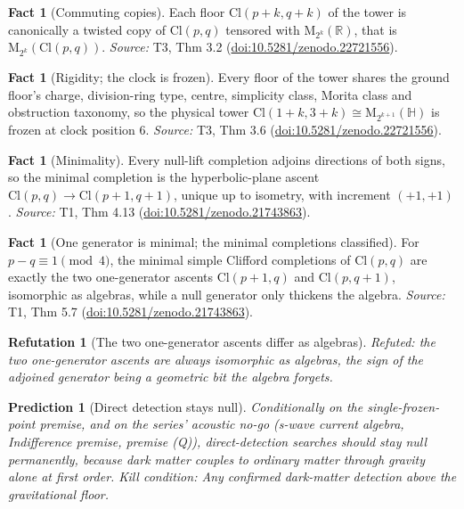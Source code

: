 \documentclass[11pt]{article}
\newtheorem{refutation}[theorem]{Refutation}
\newtheorem{prediction}[theorem]{Prediction}
\theoremstyle{definition}
\newtheorem{fact}[theorem]{Fact}
\theoremstyle{plain}
\providecommand{\Cl}{}\renewcommand{\Cl}{\mathrm{Cl}}
\providecommand{\HH}{}\renewcommand{\HH}{\mathbb{H}}
\providecommand{\Mat}{}\renewcommand{\Mat}{\mathrm{M}}
\providecommand{\R}{}\renewcommand{\R}{\mathbb{R}}
\begin{document}
\begin{fact}[Commuting copies]\label{c:tower.commuting-copies}
Each floor $\Cl(p{+}k, q{+}k)$ of the tower is canonically a twisted copy of $\Cl(p,q)$ tensored with $\Mat_{2^k}(\R)$, that is $\Mat_{2^k}(\Cl(p,q))$.
\emph{Source:} T3, Thm 3.2 (\href{https://doi.org/10.5281/zenodo.22721556}{doi:10.5281/zenodo.22721556}).
\end{fact}

\begin{fact}[Rigidity; the clock is frozen]\label{c:tower.rigidity-clock-frozen}
Every floor of the tower shares the ground floor's charge, division-ring type, centre, simplicity class, Morita class and obstruction taxonomy, so the physical tower $\Cl(1{+}k, 3{+}k) \cong \Mat_{2^{k+1}}(\HH)$ is frozen at clock position $6$.
\emph{Source:} T3, Thm 3.6 (\href{https://doi.org/10.5281/zenodo.22721556}{doi:10.5281/zenodo.22721556}).
\end{fact}

\begin{fact}[Minimality]\label{c:transport.minimality}
Every null-lift completion adjoins directions of both signs, so the minimal completion is the hyperbolic-plane ascent $\Cl(p,q) \to \Cl(p{+}1,q{+}1)$, unique up to isometry, with increment $(+1,+1)$.
\emph{Source:} T1, Thm 4.13 (\href{https://doi.org/10.5281/zenodo.21743863}{doi:10.5281/zenodo.21743863}).
\end{fact}

\begin{fact}[One generator is minimal; the minimal completions classified]\label{c:transport.one-generator-minimal-minimal-completions-classified}
For $p - q \equiv 1 \pmod 4$, the minimal simple Clifford completions of $\Cl(p,q)$ are exactly the two one-generator ascents $\Cl(p{+}1,q)$ and $\Cl(p,q{+}1)$, isomorphic as algebras, while a null generator only thickens the algebra.
\emph{Source:} T1, Thm 5.7 (\href{https://doi.org/10.5281/zenodo.21743863}{doi:10.5281/zenodo.21743863}).
\end{fact}

\begin{refutation}[The two one-generator ascents differ as algebras]\label{c:refuted.the-two-one-generator-ascents-differ-as-algebras}
Refuted: the two one-generator ascents are always isomorphic as algebras, the sign of the adjoined generator being a geometric bit the algebra forgets.
\end{refutation}

\begin{prediction}[Direct detection stays null]\label{c:pred.dark-matter-direct-detection-null}
Conditionally on the single-frozen-point premise, and on the series' acoustic no-go (s-wave current algebra, Indifference premise, premise (Q)), direct-detection searches should stay null permanently, because dark matter couples to ordinary matter through gravity alone at first order.
\emph{Kill condition:} Any confirmed dark-matter detection above the gravitational floor.
\end{prediction}
\end{document}
